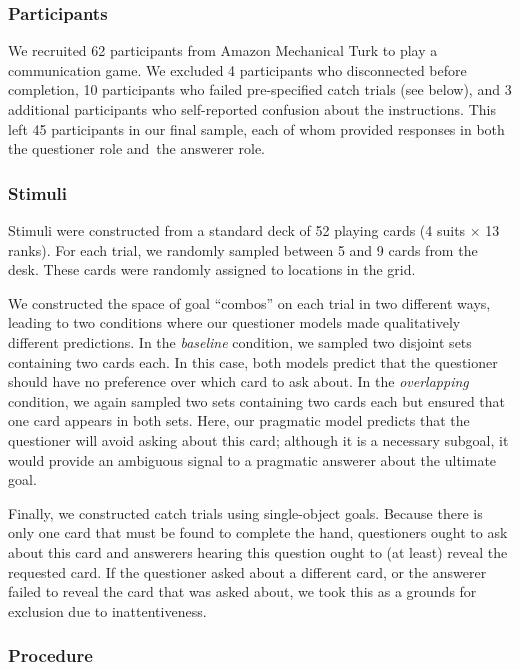 \documentclass[11pt, floatsintext]{apa6}
\begin{document}
\subsubsection{Participants}

We recruited 62 participants from Amazon Mechanical Turk to play a communication game.
We excluded 4 participants who disconnected before completion, 10 participants who failed pre-specified catch trials (see below), and 3 additional participants who self-reported confusion about the instructions.
This left 45 participants in our final sample, each of whom provided responses in both the questioner role and the answerer role.

\subsubsection{Stimuli}

Stimuli were constructed from a standard deck of 52 playing cards (4 suits $\times$ 13 ranks). 
For each trial, we randomly sampled between 5 and 9 cards from the desk. 
These cards were randomly assigned to locations in the grid. 

We constructed the space of goal ``combos'' on each trial in two different ways, leading to two conditions where our questioner models made qualitatively different predictions.
In the \emph{baseline} condition, we sampled two disjoint sets containing two cards each. 
In this case, both models predict that the questioner should have no preference over which card to ask about.
In the \emph{overlapping} condition, we again sampled two sets containing two cards each but ensured that one card appears in both sets. 
Here, our pragmatic model predicts that the questioner will avoid asking about this card; although it is a necessary subgoal, it would provide an ambiguous signal to a pragmatic answerer about the ultimate goal.

Finally, we constructed catch trials using single-object goals. 
Because there is only one card that must be found to complete the hand, questioners ought to ask about this card and answerers hearing this question ought to (at least) reveal the requested card.
If the questioner asked about a different card, or the answerer failed to reveal the card that was asked about, we took this as a grounds for exclusion due to inattentiveness.

\subsubsection{Procedure}
\end{document}
